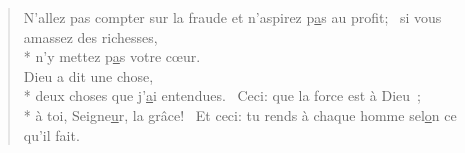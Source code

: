 \begin{verse}
N’allez pas compter sur la fraude
et n’aspirez p\underline{a}s au profit;~\psalmstar
si vous amassez des richesses, \\*
n’y mettez p\underline{a}s votre cœur. \\

Dieu a dit une chose, \\*
deux choses que j’\underline{a}i entendues.~\psalmdagger
Ceci: que la force est à Dieu ; \\*
à toi, Seigne\underline{u}r, la grâce!~\psalmstar
Et ceci: tu rends à chaque homme sel\underline{o}n ce qu’il fait. \\
\end{verse}

